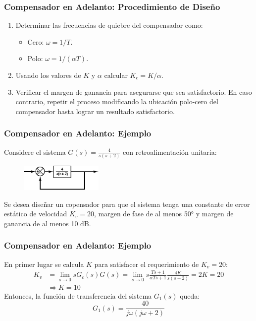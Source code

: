 \documentclass[aspectratio=169]{beamer}
\theoremstyle{definition}
\theoremstyle{plain}
\theoremstyle{remark}
\newcounter{saveenumi}
\newcommand{\seti}{\setcounter{saveenumi}{\value{enumi}}}
\newcommand{\conti}{\setcounter{enumi}{\value{saveenumi}}}
\begin{document}
\begin{frame}[<+->]\frametitle{Compensador en Adelanto: Procedimiento de Diseño}
	\begin{enumerate}
		\conti
		\item Determinar las frecuencias de quiebre del compensador como:
		\begin{itemize}
			\item Cero: $\omega = 1/T$.
			\item Polo: $\omega = 1/(\alpha T)$.
		\end{itemize}
		\item Usando los valores de $K$ y $\alpha$ calcular $K_c = K/\alpha$.
		\item Verificar el margen de ganancia para asegurarse que sea satisfactorio. En caso contrario, repetir el proceso modificando la ubicación polo-cero del compensador hasta lograr un resultado satisfactorio.
		\seti
	\end{enumerate}
\end{frame}

\begin{frame}[<+->]\frametitle{Compensador en Adelanto: Ejemplo}
	Considere el sistema $G(s) = \frac{4}{s(s+2)}$ con retroalimentación unitaria:
	\begin{figure}
		\centering
		\includegraphics[width=4cm]{images/leadCompExampleSystem.eps}
	\end{figure}
	Se desea diseñar un copensador para que el sistema tenga una constante de error estático de velocidad $K_v = 20$, margen de fase de al menos \ang{50} y margen de ganancia de al menos 10 dB.
\end{frame}

\begin{frame}[<+->]\frametitle{Compensador en Adelanto: Ejemplo}
	En primer lugar se calcula $K$ para satisfacer el requerimiento de $K_v = 20$:
	\begin{align*}
		K_v &= \lim_{s\rightarrow 0} sG_c(s)G(s) = \lim_{s \rightarrow 0} s\frac{Ts+1}{\alpha T s + 1} \frac{4K}{s(s+2)} = 2K = 20\\
		&\Rightarrow K = 10
	\end{align*}
	\pause
	Entonces, la función de transferencia del sistema $G_1(s)$ queda:
	\begin{equation*}
		G_1(s) = \frac{40}{j\omega(j\omega+2)}
	\end{equation*}
\end{frame}
\end{document}
